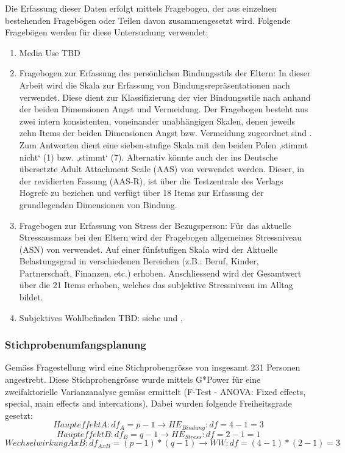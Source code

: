 Die Erfassung dieser Daten erfolgt mittels Fragebogen, der aus einzelnen bestehenden Fragebögen oder Teilen davon zusammengesetzt wird. Folgende Fragebögen werden für diese Untersuchung verwendet:
\begin{enumerate}
    \item Media Use TBD
    \item Fragebogen zur Erfassung des persönlichen Bindungsstils der Eltern: 
In dieser Arbeit wird die Skala zur Erfassung von Bindungsrepräsentationen nach  verwendet. Diese dient zur Klassifizierung der vier Bindungsstile nach  anhand der beiden Dimensionen Angst und Vermeidung. Der Fragebogen besteht aus zwei intern konsistenten, voneinander unabhängigen Skalen, denen jeweils zehn Items der beiden Dimensionen Angst bzw. Vermeidung zugeordnet sind \cite{Baadte2006}. Zum Antworten dient eine sieben-stufige Skala mit den beiden Polen ‚stimmt nicht‘ (1) bzw. ‚stimmt‘ (7). Alternativ könnte auch der ins Deutsche übersetzte Adult Attachment Scale (AAS) von  verwendet werden. Dieser, in der revidierten Fassung (AAS-R),  ist über die Testzentrale des Verlags Hogrefe zu beziehen und verfügt über 18 Items zur Erfassung der grundlegenden Dimensionen von Bindung.
    \item Fragebogen zur Erfassung von Stress der Bezugsperson: Für das aktuelle Stressausmass bei den Eltern wird der Fragebogen allgemeines Stressniveau (ASN) von  verwendet. Auf einer fünfstufigen Skala wird der Aktuelle Belastungsgrad in verschiedenen Bereichen (z.B.: Beruf, Kinder, Partnerschaft, Finanzen, etc.) erhoben. Anschliessend wird der Gesamtwert über die 21 Items erhoben, welches das subjektive Stressniveau im Alltag bildet.
    
    \item Subjektives Wohlbefinden TBD: siehe \cite{AmericanAcademyofPediatrics2013} und \cite{Plowman2014}, \cite{Nikken2014}
\end{enumerate}

\subsubsection{Stichprobenumfangsplanung}
Gemäss Fragestellung wird eine Stichprobengrösse von insgesamt 231 Personen angestrebt. Diese Stichprobengrösse wurde mittels G*Power \cite{Faul2009} für eine zweifaktorielle Varianzanalyse gemäss  ermittelt (F-Test - ANOVA: Fixed effects, special, main effects and intercations). Dabei wurden folgende Freiheitsgrade gesetzt:
\begin{equation}
    Haupteffekt A: df_{A} = p-1 \rightarrow HE_{Bindung}: df = 4-1=3
\end{equation}
\begin{equation}
    Haupteffekt B: df_{B} = q-1 \rightarrow HE_{Stress}: df = 2-1=1
\end{equation}
\begin{equation}
    Wechselwirkung AxB: df_{AxB} = (p-1)*(q-1) \rightarrow WW: df = (4-1)*(2-1)=3
\end{equation}\\

